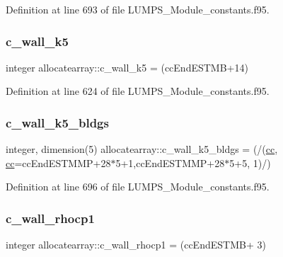 Definition at line 693 of file L\+U\+M\+P\+S\+\_\+\+Module\+\_\+constants.\+f95.

\mbox{\label{namespaceallocatearray_a5b98b9215a2082f2d78493729899d3f8}} 
\subsubsection{\texorpdfstring{c\+\_\+wall\+\_\+k5}{c\_wall\_k5}}
{\footnotesize\ttfamily integer allocatearray\+::c\+\_\+wall\+\_\+k5 = (cc\+End\+E\+S\+T\+MB+14)}



Definition at line 624 of file L\+U\+M\+P\+S\+\_\+\+Module\+\_\+constants.\+f95.

\mbox{\label{namespaceallocatearray_a53001a7584fdc2aafd07c9e6809df27f}} 
\subsubsection{\texorpdfstring{c\+\_\+wall\+\_\+k5\+\_\+bldgs}{c\_wall\_k5\_bldgs}}
{\footnotesize\ttfamily integer, dimension(5) allocatearray\+::c\+\_\+wall\+\_\+k5\+\_\+bldgs = (/(\hyperlink{namespaceallocatearray_ac863c81704eb507dee10f5e10741e10c}{cc}, \hyperlink{namespaceallocatearray_ac863c81704eb507dee10f5e10741e10c}{cc}=cc\+End\+E\+S\+T\+M\+MP+28$\ast$5+1,cc\+End\+E\+S\+T\+M\+MP+28$\ast$5+5, 1)/)}



Definition at line 696 of file L\+U\+M\+P\+S\+\_\+\+Module\+\_\+constants.\+f95.

\mbox{\label{namespaceallocatearray_a7df439fa2fe23b75ee91c800a099e0ea}} 
\subsubsection{\texorpdfstring{c\+\_\+wall\+\_\+rhocp1}{c\_wall\_rhocp1}}
{\footnotesize\ttfamily integer allocatearray\+::c\+\_\+wall\+\_\+rhocp1 = (cc\+End\+E\+S\+T\+MB+ 3)}




